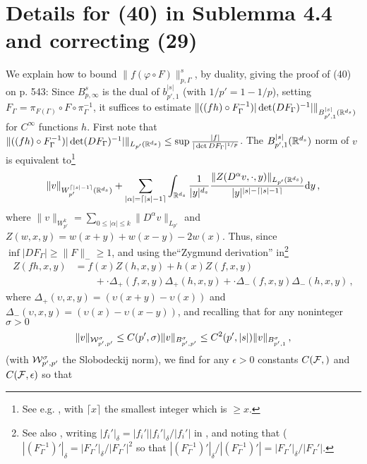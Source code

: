 \documentclass[10pt,twoside]{amsart}
\begin{document}
\section{Details for   (40) in Sublemma 4.4 and correcting (29)}

We explain how to   bound $\| f(\varphi \circ F)\|^s_{p,\Gamma}$, by duality,
giving the proof of  (40) on p. 543:
 Since $B^s_{p,\infty}$ is the dual of $b^{|s|}_{p',1}$ (with $1/p'=1-1/p$),   setting
  $F_\Gamma= \pi_{F(\Gamma)} \circ F\circ \pi_\Gamma^{-1}$, it suffices
 to estimate $\| ((fh) \circ F_\Gamma^{-1}) |\det( DF_\Gamma)^{-1}|\|_{B^{|s|}_{p',1}(\mathbb{R}^{d_s})}$
  for  $C^\infty$ functions $h$.
First note that $\| ((fh) \circ F_\Gamma^{-1}) |\det( DF_\Gamma)^{-1}|\|_{L_{p'}(\mathbb{R}^{d_s})}
\le \sup \frac{| f |}{|\det DF_\Gamma|^{1/p}}$.
 The $B^{|s|}_{p',1}(\mathbb{R}^{d_s})$ norm of $v$ is equivalent to\footnote{See e.g. \cite[\S 2.1]{RS}, with $\lceil x\rceil$  the smallest
 integer which is $\ge x$.}
 $$
 \|v\|_{W^{ \lceil |s|-1\rceil}_{p'}(\mathbb{R}^{d_s})}+
 \sum_{|\alpha| = \lceil |s|-1\rceil} \int_{\mathbb{R}^{d_s}} \frac{1}{|y|^{d_s} }
\frac{ \|Z(D^\alpha v,\cdot, y) \|_{L_{p'}(\mathbb{R}^{d_s})} }{|y|^{ |s|- \lceil |s|-1 \rceil}} \mathrm {d} y \, ,
 $$
 where $\|v\|_{W^k_{p'}}= \sum_{0\le |\alpha| \le k} \|D^\alpha v\|_{L_{p'}}$ and $Z(w,x,y)= w(x+y)+w(x-y)-2 w(x)$.
Thus,  
 since $\inf |DF_\Gamma|\ge \|F\|_-\ge 1$, 
and using 
the``Zygmund derivation'' in\footnote{See also \cite[(2.6)--(2.8)]{BJL}, writing
$|f_i'|_\delta=|f_i'||f_i'|_\delta/|f_i'|$ in \cite[(2.5)]{BJL}, and noting that
($|(F_\Gamma^{-1})'|_\delta= |F_\Gamma'|_\delta/|F_\Gamma'|^2$ so that $|(F_\Gamma^{-1})'|_\delta/|(F_\Gamma^{-1})'|=|F_\Gamma'|_\delta/|F_\Gamma'|$.} \cite[\S 2]{BJL} 
\begin{align*}
Z(f h, x,y)
&=f(x) Z(h, x,y)
+ h(x) Z(f, x,y)\\
&\qquad +  \cdot\Delta_+ (f,x,y) \Delta_+(h,x,y)
+ \cdot \Delta_-(f,x,y)\Delta_-(h,x,y) \, ,
\end{align*}
where  
$\Delta_+(\upsilon,x,y)=(\upsilon(x+y)-\upsilon(x))$
and $\Delta_-(\upsilon,x,y)=(\upsilon(x)-\upsilon(x-y))$,
and recalling that for any noninteger $\sigma>0$
   \cite[Prop 2.1.2, Prop 2.2.1]{RS}
$$\|v\|_{\mathcal{W}^{\sigma}_{p',p'}}\le C (p',\sigma) \|v\|_{B^{\sigma}_{p',p'}}\le  C^2 (p',|s|) \|v\|_{B^{\sigma}_{p',1}}\, ,
$$
(with $\mathcal{W}^{\sigma}_{p',p'}$ the Slobodeckij norm),
we find   for any $\epsilon>0$ constants $C(\mathcal{F},)$ and $C(\mathcal{F},\epsilon)$
so that
\end{document}
